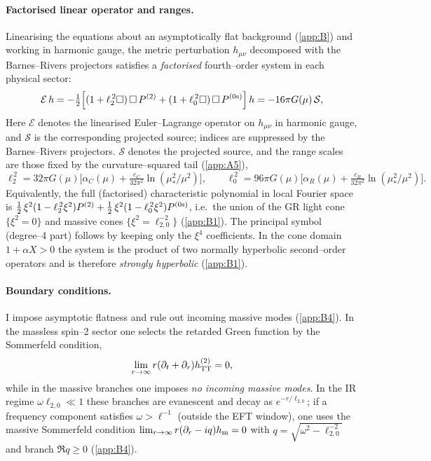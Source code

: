 \documentclass{iopjournal}
\begin{document}
\paragraph{Factorised linear operator and ranges.}
Linearising the equations about an asymptotically flat background (\cref{app:B}) and working in harmonic gauge, the metric perturbation $h_{\mu\nu}$ decomposed with the Barnes–Rivers projectors satisfies a \emph{factorised} fourth–order system in each physical sector:
\begin{equation}
\mathcal{E}\,h
=-\tfrac12\Big[(1+\ell_2^{\,2}\Box)\,\Box\,P^{(2)}+(1+\ell_0^{\,2}\Box)\,\Box\,P^{(0{\rm s})}\Big]\,h
=-16\pi G(\mu)\,\mathcal S,
\label{eq:lin_factor}
\end{equation}
Here $\mathcal E$ denotes the linearised Euler–Lagrange operator on $h_{\mu\nu}$ in harmonic gauge, and $\mathcal S$ is the corresponding projected source; indices are suppressed by the Barnes–Rivers projectors.
 $\mathcal S$ denotes the projected source, and the range scales are those fixed by the curvature–squared tail (\cref{app:A5}),
\begin{equation}
\ell_2^{\,2}=32\pi G(\mu)\Big[\alpha_C(\mu)+\tfrac{c_C}{32\pi^2}\ln(\mu_*^2/\mu^2)\Big],\qquad
\ell_0^{\,2}=96\pi G(\mu)\Big[\alpha_R(\mu)+\tfrac{c_R}{32\pi^2}\ln(\mu_*^2/\mu^2)\Big].
\label{eq:lin_ranges}
\end{equation}
Equivalently, the full (factorised) characteristic polynomial in local Fourier space is
$\tfrac12\,\xi^2(1-\ell_2^{\,2}\xi^2)P^{(2)}+\tfrac12\,\xi^2(1-\ell_0^{\,2}\xi^2)P^{(0{\rm s})}$, i.e.\ the union of the GR light cone $\{\xi^2=0\}$ and massive cones $\{\xi^2=\ell_{2,0}^{-2}\}$ (\cref{app:B1}). The principal symbol (degree–4 part) follows by keeping only the $\xi^4$ coefficients. In the cone domain $1+\alpha X>0$ the system is the product of two normally hyperbolic second–order operators and is therefore \emph{strongly hyperbolic} (\cref{app:B1}).

\paragraph{Boundary conditions.}
I impose asymptotic flatness and rule out incoming massive modes (\cref{app:B4}). In the massless spin–2 sector one selects the retarded Green function by the Sommerfeld condition,
\begin{equation}
\lim_{r\to\infty} r(\partial_t+\partial_r)h^{(2)}_{\rm TT}=0,
\label{eq:lin_bc_massless}
\end{equation}
while in the massive branches one imposes \emph{no incoming massive modes}. In the IR regime $\omega\ell_{2,0}\ll1$ these branches are evanescent and decay as $e^{-r/\ell_{2,0}}$; if a frequency component satisfies $\omega>\ell^{-1}$ (outside the EFT window), one uses the massive Sommerfeld condition $\lim_{r\to\infty}r(\partial_r-i q)h_{\rm m}=0$ with $q=\sqrt{\omega^2-\ell_{2,0}^{-2}}$ and branch $\Re q\ge0$ (\cref{app:B4}).
\end{document}
